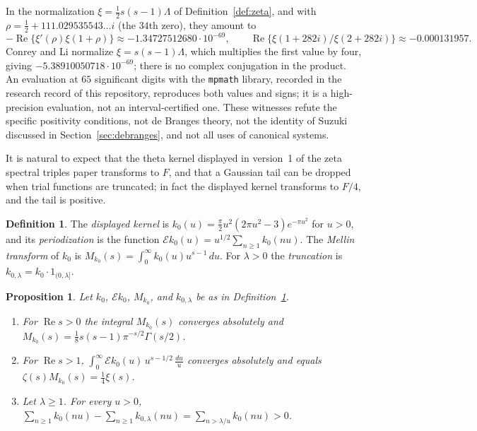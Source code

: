 \documentclass[11pt]{amsart}
\theoremstyle{plain}
\newtheorem{proposition}[theorem]{Proposition}
\theoremstyle{definition}
\newtheorem{definition}[theorem]{Definition}
\theoremstyle{remark}
\numberwithin{equation}{section}
\DeclareMathOperator{\Rea}{Re}
\renewcommand{\Re}{\Rea}
\begin{document}
In the normalization
$\xi=\tfrac12s(s-1)\Lambda$ of Definition~\ref{def:zeta}, and with
$\rho=\tfrac12+111.029535543\ldots i$ (the $34$th zero), they amount to
\[
-\Re\{\xi'(\rho)\xi(1+\rho)\}\approx-1.34727512680\cdot10^{-69},
\qquad
\Re\{\xi(1+282i)/\xi(2+282i)\}\approx-0.000131957.
\]
Conrey and Li normalize $\xi=s(s-1)\Lambda$, which multiplies the first
value by four, giving $-5.38910050718\cdot10^{-69}$; there is no complex
conjugation in the product. An evaluation at $65$ significant digits
with the \texttt{mpmath} library, recorded in the research record of
this repository, reproduces both values and signs; it is a
high-precision evaluation, not an interval-certified one. These
witnesses refute the specific positivity conditions, not de Branges
theory, not the identity of Suzuki discussed in
Section~\ref{sec:debranges}, and not all uses of canonical systems.

It is natural to expect that the theta kernel displayed in version~1 of
the zeta spectral triples paper transforms to $F$, and that a Gaussian
tail can be dropped when trial functions are truncated; in fact the
displayed kernel transforms to $F/4$, and the tail is positive.

\begin{definition}\label{def:ccm-kernel}
The \emph{displayed kernel} is
$k_0(u)=\tfrac\pi2u^2(2\pi u^2-3)e^{-\pi u^2}$ for $u>0$, and its
\emph{periodization} is the function
$\mathcal Ek_0(u)=u^{1/2}\sum_{n\ge1}k_0(nu)$. The
\emph{Mellin transform} of $k_0$ is
$M_{k_0}(s)=\int_0^\infty k_0(u)u^{s-1}\,du$. For $\lambda>0$ the
\emph{truncation} is $k_{0,\lambda}=k_0\cdot1_{(0,\lambda]}$.
\end{definition}

\begin{proposition}\label{prop:R15}
Let $k_0$, $\mathcal Ek_0$, $M_{k_0}$, and $k_{0,\lambda}$ be as
in Definition~\ref{def:ccm-kernel}.
\begin{enumerate}[label=(\roman*)]
\item\label{item:R15-mellin} For $\Re s>0$ the integral $M_{k_0}(s)$
  converges absolutely and
  $M_{k_0}(s)=\tfrac18s(s-1)\pi^{-s/2}\Gamma(s/2)$.
\item\label{item:R15-xi} For $\Re s>1$,
  $\int_0^\infty\mathcal Ek_0(u)\,u^{s-1/2}\,\frac{du}u$ converges
  absolutely and equals $\zeta(s)M_{k_0}(s)=\tfrac14\xi(s)$.
\item\label{item:R15-tail} Let $\lambda\ge1$. For every $u>0$,
  $\sum_{n\ge1}k_0(nu)-\sum_{n\ge1}k_{0,\lambda}(nu)
  =\sum_{n>\lambda/u}k_0(nu)>0$.
\end{enumerate}
\end{proposition}
\end{document}
